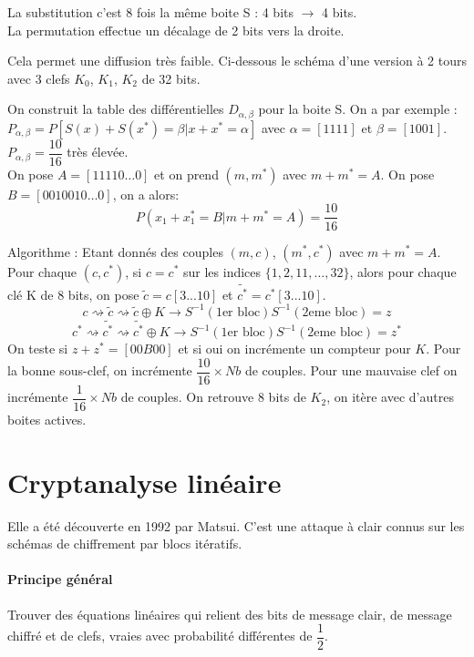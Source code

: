 \documentclass[12pt,a4paper]{report}
\begin{document}
La substitution c'est 8 fois la même boite S : 4 bits $\rightarrow$ 4 bits.\\
La permutation effectue un décalage de 2 bits vers la droite.
\begin{center}
  \scalebox{0.6}{}	
\end{center}
Cela permet une diffusion très faible.
Ci-dessous le schéma d'une version à 2 tours avec 3 clefs $K_0$, $K_1$, $K_2$ de 32 bits.
\begin{center}
  \scalebox{0.6}{}	
\end{center}
On construit la table des différentielles $D_{\alpha,\beta}$ pour la boite S. On a par exemple : $P_{\alpha,\beta} = P[S(x)+S(x^*)= \beta |x+x^*=\alpha]$ avec $\alpha =[1111]$ et $\beta = [1001]$. $P_{\alpha,\beta}=\dfrac{10}{16}$ très élevée.\\
On pose $A=[11110\ldots0]$ et on prend $(m,m^*)$ avec $m+m^*=A$. On pose $ B = [0010010\ldots0]$, on a alors:
$$ P(x_1+x_1^*=B | m+m^*=A) = \dfrac{10}{16}$$
\begin{center}
  \scalebox{0.6}{}	
\end{center}

Algorithme : Etant donnés des couples $(m,c)$, $(m^*,c^*)$ avec $m+m^*=A$. Pour chaque $(c,c^*)$, si $c=c^*$ sur les indices $\{1,2,11,\ldots,32\}$, alors pour chaque clé K de 8 bits, on pose $\tilde{c}=c[3...10]$ et $\tilde{c^*}=c^*[3...10]$.
$$ c \rightsquigarrow \tilde{c} \rightsquigarrow \tilde{c} \oplus K\rightarrow S^{-1}(\mbox{1er bloc})S^{-1}(\mbox{2eme bloc})=z $$
$$ c^* \rightsquigarrow \tilde{c^*} \rightsquigarrow \tilde{c^*} \oplus K\rightarrow S^{-1}(\mbox{1er bloc})S^{-1}(\mbox{2eme bloc})=z^* $$
On teste si $z+z^* = [00B00]$ et si oui on incrémente un compteur pour $K$. Pour la bonne sous-clef, on incrémente $\dfrac{10}{16} \times Nb$ de couples. Pour une mauvaise clef on incrémente $\dfrac{1}{16} \times Nb$ de couples. On retrouve 8 bits de $K_2$, on itère avec d'autres boites actives.
\section{Cryptanalyse linéaire}
Elle a été découverte en 1992 par Matsui. C'est une attaque à clair connus sur les schémas de chiffrement par blocs itératifs.
\paragraph{Principe général\\}
Trouver des équations linéaires qui relient des bits de message clair, de message chiffré et de clefs, vraies avec probabilité différentes de $\dfrac{1}{2}$.
\end{document}
